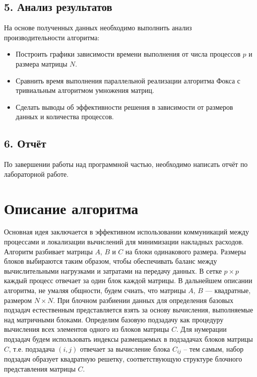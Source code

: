 \documentclass{report}
\begin{document}
\subsection*{5. Анализ результатов}
На основе полученных данных необходимо выполнить анализ производительности алгоритма:
\begin{itemize}
    \item Построить графики зависимости времени выполнения от числа процессов \(p\) и размера матрицы \(N\).
    \item Сравнить время выполнения параллельной реализации алгоритма Фокса с тривиальным алгоритмом умножения матриц.
    \item Сделать выводы об эффективности решения в зависимости от размеров данных и количества процессов.
\end{itemize}

\subsection*{6. Отчёт}
По завершении работы над программной частью, необходимо написать отчёт по лабораторной работе. 

\newpage

\section*{Описание алгоритма}

Основная идея заключается в эффективном использовании коммуникаций между процессами и локализации вычислений для минимизации накладных расходов. Алгоритм разбивает матрицы \(A\), \(B\) и \(C\) на блоки одинакового размера. Размеры блоков выбираются таким образом, чтобы обеспечивать баланс между вычислительными нагрузками и затратами на передачу данных. В сетке \(p \times p\) каждый процесс отвечает за один блок каждой матрицы. В дальнейшем описании алгоритма, не умаляя общности, будем счиать, что матрицы \(A\), \(B\) --- квадратные, размером \(N \times N\). При блочном разбиении данных для определения базовых подзадач естественным представляется взять за основу вычисления, выполняемые над матричными блоками. Определим базовую подзадачу как процедуру вычисления всех элементов одного из блоков матрицы {\itshape $C$}. Для нумерации подзадач будем использовать индексы размещаемых в подзадачах блоков матрицы {\itshape $C$}, т.е. подзадача {\itshape $(i,j)$} отвечает за вычисление блока {\itshape $C_{ij}$} – тем самым, набор подзадач образует квадратную решетку, соответствующую структуре блочного представления матрицы {\itshape $C$}.
\end{document}
